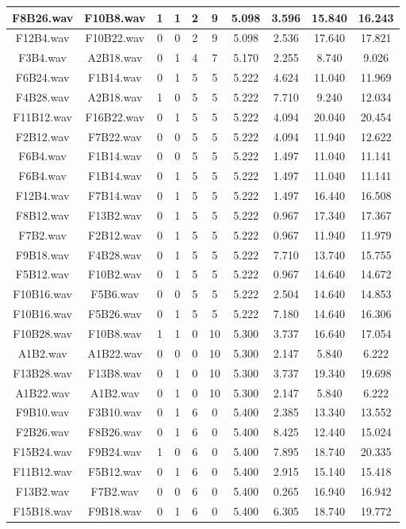 \documentclass[11pt,a4paper]{book}
\begin{document}
\begin{longtable}[c]{|c|c|c|c|c|c|c|c|c|c|}
F8B26.wav&F10B8.wav&1&1&2&9&5.098&3.596&15.840&16.243\\ \hline
F12B4.wav&F10B22.wav&0&0&2&9&5.098&2.536&17.640&17.821\\ \hline
F3B4.wav&A2B18.wav&0&1&4&7&5.170&2.255&8.740&9.026\\ \hline
F6B24.wav&F1B14.wav&0&1&5&5&5.222&4.624&11.040&11.969\\ \hline
F4B28.wav&A2B18.wav&1&0&5&5&5.222&7.710&9.240&12.034\\ \hline
F11B12.wav&F16B22.wav&0&1&5&5&5.222&4.094&20.040&20.454\\ \hline
F2B12.wav&F7B22.wav&0&0&5&5&5.222&4.094&11.940&12.622\\ \hline
F6B4.wav&F1B14.wav&0&0&5&5&5.222&1.497&11.040&11.141\\ \hline
F6B4.wav&F1B14.wav&0&1&5&5&5.222&1.497&11.040&11.141\\ \hline
F12B4.wav&F7B14.wav&0&1&5&5&5.222&1.497&16.440&16.508\\ \hline
F8B12.wav&F13B2.wav&0&1&5&5&5.222&0.967&17.340&17.367\\ \hline
F7B2.wav&F2B12.wav&0&1&5&5&5.222&0.967&11.940&11.979\\ \hline
F9B18.wav&F4B28.wav&0&1&5&5&5.222&7.710&13.740&15.755\\ \hline
F5B12.wav&F10B2.wav&0&1&5&5&5.222&0.967&14.640&14.672\\ \hline
F10B16.wav&F5B6.wav&0&0&5&5&5.222&2.504&14.640&14.853\\ \hline
F10B16.wav&F5B26.wav&0&1&5&5&5.222&7.180&14.640&16.306\\ \hline
F10B28.wav&F10B8.wav&1&1&0&10&5.300&3.737&16.640&17.054\\ \hline
A1B2.wav&A1B22.wav&0&0&0&10&5.300&2.147&5.840&6.222\\ \hline
F13B28.wav&F13B8.wav&0&1&0&10&5.300&3.737&19.340&19.698\\ \hline
A1B22.wav&A1B2.wav&0&1&0&10&5.300&2.147&5.840&6.222\\ \hline
F9B10.wav&F3B10.wav&0&1&6&0&5.400&2.385&13.340&13.552\\ \hline
F2B26.wav&F8B26.wav&0&1&6&0&5.400&8.425&12.440&15.024\\ \hline
F15B24.wav&F9B24.wav&1&0&6&0&5.400&7.895&18.740&20.335\\ \hline
F11B12.wav&F5B12.wav&0&1&6&0&5.400&2.915&15.140&15.418\\ \hline
F13B2.wav&F7B2.wav&0&0&6&0&5.400&0.265&16.940&16.942\\ \hline
F15B18.wav&F9B18.wav&0&1&6&0&5.400&6.305&18.740&19.772\\ \hline

\end{longtable}
\end{document}

